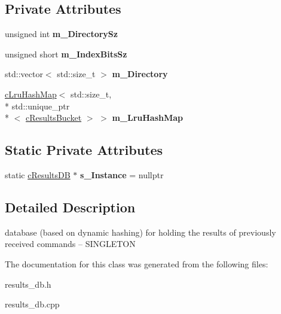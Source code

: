 \subsection*{Private Attributes}
\begin{DoxyCompactItemize}
\item 
\hypertarget{classresultsDB_1_1cResultsDB_a7995d8db612f870c10e630ed3c7227ca}{unsigned int {\bfseries m\-\_\-\-Directory\-Sz}}\label{classresultsDB_1_1cResultsDB_a7995d8db612f870c10e630ed3c7227ca}

\item 
\hypertarget{classresultsDB_1_1cResultsDB_afa72d39f2089001696d68130b24f6b84}{unsigned short {\bfseries m\-\_\-\-Index\-Bits\-Sz}}\label{classresultsDB_1_1cResultsDB_afa72d39f2089001696d68130b24f6b84}

\item 
\hypertarget{classresultsDB_1_1cResultsDB_ac36f682079988ffe2fe6b448491ebb81}{std\-::vector$<$ std\-::size\-\_\-t $>$ {\bfseries m\-\_\-\-Directory}}\label{classresultsDB_1_1cResultsDB_ac36f682079988ffe2fe6b448491ebb81}

\item 
\hypertarget{classresultsDB_1_1cResultsDB_a9ef17deaa280d2b4768357b3756ae6c3}{\hyperlink{classresultsDB_1_1cLruHashMap}{c\-Lru\-Hash\-Map}$<$ std\-::size\-\_\-t, \\*
std\-::unique\-\_\-ptr\\*
$<$ \hyperlink{classresultsDB_1_1cResultsBucket}{c\-Results\-Bucket} $>$ $>$ {\bfseries m\-\_\-\-Lru\-Hash\-Map}}\label{classresultsDB_1_1cResultsDB_a9ef17deaa280d2b4768357b3756ae6c3}

\end{DoxyCompactItemize}
\subsection*{Static Private Attributes}
\begin{DoxyCompactItemize}
\item 
\hypertarget{classresultsDB_1_1cResultsDB_aa8a36a2445a905cc65b79990bdfb0fc7}{static \hyperlink{classresultsDB_1_1cResultsDB}{c\-Results\-D\-B} $\ast$ {\bfseries s\-\_\-\-Instance} = nullptr}\label{classresultsDB_1_1cResultsDB_aa8a36a2445a905cc65b79990bdfb0fc7}

\end{DoxyCompactItemize}


\subsection{Detailed Description}
database (based on dynamic hashing) for holding the results of previously received commands -- S\-I\-N\-G\-L\-E\-T\-O\-N 

The documentation for this class was generated from the following files\-:\begin{DoxyCompactItemize}
\item 
results\-\_\-db.\-h\item 
results\-\_\-db.\-cpp\end{DoxyCompactItemize}

